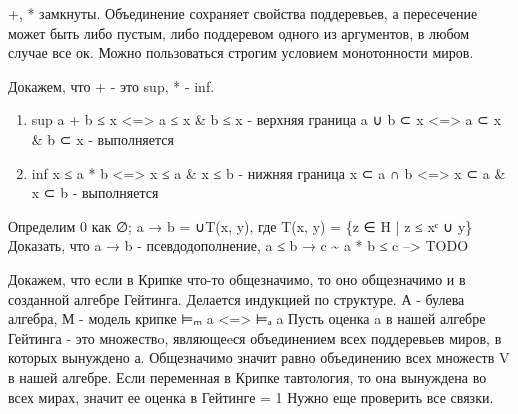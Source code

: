 \documentclass[11pt]{article}
\begin{document}
+, * замкнуты. Объединение сохраняет свойства поддеревьев, а
пересечение может быть либо пустым, либо поддеревом одного из
аргументов, в любом случае все ок. Можно пользоваться строгим условием
монотонности миров.

Докажем, что + - это sup, * - inf.
\begin{enumerate}
\item sup
a + b ≤ x <=> a ≤ x \& b ≤ x - верхняя граница
a ∪ b ⊂ x <=> a ⊂ x \& b ⊂ x - выполняется
\item inf
x ≤ a * b <=> x ≤ a \& x ≤ b - нижняя граница
x ⊂ a ∩ b <=> x ⊂ a \& x ⊂ b - выполняется
\end{enumerate}

Определим 0 как ∅;
a → b = ∪T(x, y), где T(x, y) = \{z ∈ H | z ≤ xᶜ ∪ y\}
Доказать, что a → b - псевдодополнение,
a ≤ b → c \textasciitilde{} a * b ≤ c
-->   TODO

Докажем, что если в Крипке что-то общезначимо, то оно общезначимо
и в созданной алгебре Гейтинга.
Делается индукцией по структуре. А - булева алгебра, М - модель крипке
⊨ₘ a <=> ⊨ₐ a
Пусть оценка a в нашей алгебре Гейтинга - это множествo, являющеeся
объединением всех поддеревьев миров, в которых вынуждено а. Общезначимо
значит равно объединению всех множеств V в нашей алгебре.
Если переменная в Крипке тавтология, то она вынуждена во всех мирах,
значит ее оценка в Гейтинге = 1
Нужно еще проверить все связки.
\end{document}
